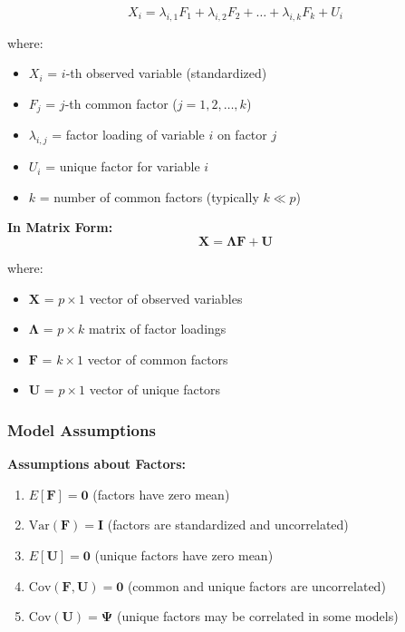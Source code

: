 \documentclass[
]{article}
\begin{document}
\[X_{i} = \lambda_{i,1}F_{1} + \lambda_{i,2}F_{2} + \ldots + \lambda_{i,k}F_{k} + U_{i}\]

where:

\begin{itemize}
\item
  \(X_{i}\) = \(i\)-th observed variable (standardized)
\item
  \(F_{j}\) = \(j\)-th common factor (\(j = 1,2,\ldots,k\))
\item
  \(\lambda_{i,j}\) = factor loading of variable \(i\) on factor \(j\)
\item
  \(U_{i}\) = unique factor for variable \(i\)
\item
  \(k\) = number of common factors (typically \(k \ll p\))
\end{itemize}

\textbf{In Matrix Form:}
\[\mathbf{X} = \mathbf{\Lambda}\mathbf{F} + \mathbf{U}\]

where:

\begin{itemize}
\item
  \(\mathbf{X}\) = \(p \times 1\) vector of observed variables
\item
  \(\mathbf{\Lambda}\) = \(p \times k\) matrix of factor loadings
\item
  \(\mathbf{F}\) = \(k \times 1\) vector of common factors
\item
  \(\mathbf{U}\) = \(p \times 1\) vector of unique factors
\end{itemize}

\subsubsection{Model Assumptions}

\textbf{Assumptions about Factors:}

\begin{enumerate}
\item
  \(E\left\lbrack \mathbf{F} \right\rbrack = \mathbf{0}\) (factors have
  zero mean)
\item
  \(\text{Var}\left( \mathbf{F} \right) = \mathbf{I}\) (factors are
  standardized and uncorrelated)
\item
  \(E\left\lbrack \mathbf{U} \right\rbrack = \mathbf{0}\) (unique
  factors have zero mean)
\item
  \(\text{Cov}\left( \mathbf{F},\mathbf{U} \right) = \mathbf{0}\)
  (common and unique factors are uncorrelated)
\item
  \(\text{Cov}\left( \mathbf{U} \right) = \mathbf{\Psi}\) (unique
  factors may be correlated in some models)
\end{enumerate}
\end{document}
